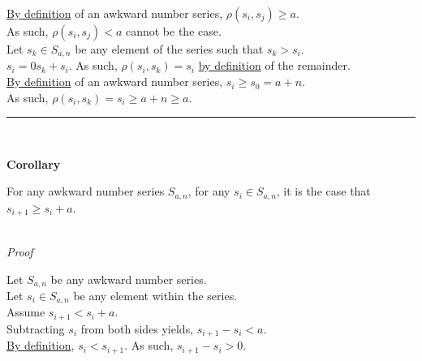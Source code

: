 \documentclass[a4paper,12pt]{article}
\begin{document}
\noindent \hyperlink{definition:awkward_number_series}{By definition} of an awkward number series, $\rho(s_i, s_j) \geq a$.\\

\noindent As such, $\rho(s_i, s_j) < a$ cannot be the case.\\

\noindent Let $s_k \in S_{a, n}$ be any element of the series such that $s_k > s_i$.\\

\noindent $s_i = 0s_k + s_i$. As such, $\rho(s_i, s_k) = s_i$ \hyperlink{theorem:remainder_theorem}{by definition} of the remainder.\\

\noindent \hyperlink{definition:awkward_number_series}{By definition} of an awkward number series, $s_i \geq s_0 = a + n$.\\

\noindent As such, $\rho(s_i, s_k) = s_i \geq a + n \geq a$.

\begin{center}
\noindent\rule{8cm}{0.4pt}
\end{center}
\noindent \\






\label{corollary:non_divisibility_of_elements}
\hypertarget{corollary:non_divisibility_of_elements}{}
\begin{tcolorbox}
\textbf{Corollary}

For any awkward number series $S_{a, n}$, for any $s_i \in S_{a, n}$, it is the case that $s_{i + 1} \geq s_i + a$.
\end{tcolorbox}

\noindent \\
\textit{Proof}

\noindent Let $S_{a, n}$ be any awkward number series.\\

\noindent Let $s_i \in S_{a, n}$ be any element within the series.\\

\noindent Assume $s_{i + 1} < s_i + a$.\\

\noindent Subtracting $s_i$ from both sides yields, $s_{i + 1} - s_i < a$.\\

\noindent \hyperlink{definition:awkward_number_series}{By definition}, $s_i < s_{i + 1}$. As such, $s_{i + 1} - s_i > 0$.\\
\end{document}
